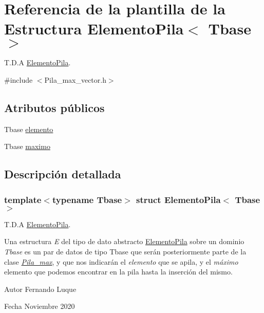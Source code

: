 \hypertarget{structElementoPila}{}\section{Referencia de la plantilla de la Estructura Elemento\+Pila$<$ Tbase $>$}
\label{structElementoPila}


T.\+D.\+A \hyperlink{structElementoPila}{Elemento\+Pila}.  




{\ttfamily \#include $<$Pila\+\_\+max\+\_\+vector.\+h$>$}

\subsection*{Atributos públicos}
\begin{DoxyCompactItemize}
\item 
Tbase \hyperlink{structElementoPila_a2c210252f4d74fc9975cba3784a7b0e3}{elemento}
\item 
Tbase \hyperlink{structElementoPila_a6e6e77f455669318e9e6fe5e4f52c9bc}{maximo}
\end{DoxyCompactItemize}


\subsection{Descripción detallada}
\subsubsection*{template$<$typename Tbase$>$\newline
struct Elemento\+Pila$<$ Tbase $>$}

T.\+D.\+A \hyperlink{structElementoPila}{Elemento\+Pila}. 

Una estructura {\itshape E} del tipo de dato abstracto \hyperlink{structElementoPila}{Elemento\+Pila} sobre un dominio {\itshape Tbase} es un par de datos de tipo Tbase que serán posteriormente parte de la clase {\itshape \hyperlink{classPila__max}{Pila\+\_\+max}}, y que nos indicarán el {\itshape elemento} que se apila, y el {\itshape máximo} elemento que podemos encontrar en la pila hasta la inserción del mismo.

\begin{DoxyAuthor}{Autor}
Fernando Luque 
\end{DoxyAuthor}
\begin{DoxyDate}{Fecha}
Noviembre 2020 
\end{DoxyDate}


